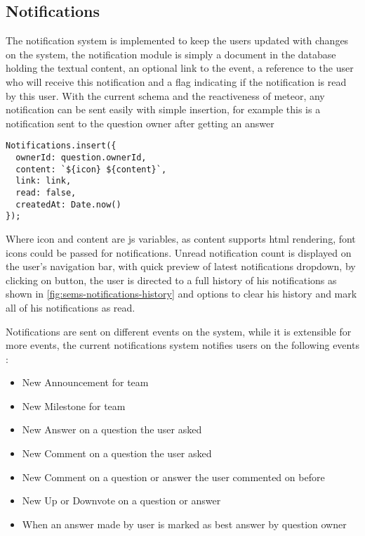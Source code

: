 \subsection{Notifications}
\label{sub:notifications}
The notification system is implemented to keep the users updated with changes on the system, the notification module is
simply a document in the database holding the textual content, an optional link to the event, a reference to the user who will receive this
notification and a flag indicating if the notification is read by this user. With the current schema and the reactiveness of meteor,
any notification can be sent easily with simple insertion, for example this is a notification sent to the question owner
after getting an answer
\vspace{15cm}
\begin{verbatim}
Notifications.insert({
  ownerId: question.ownerId,
  content: `${icon} ${content}`,
  link: link,
  read: false,
  createdAt: Date.now()
});
\end{verbatim}

\newParagraph
Where icon and content are \ac{js} variables, as content supports html rendering, font icons could be passed
for notifications. Unread notification count is displayed on the user's navigation bar, with quick preview of latest notifications dropdown,
by clicking on  button, the user is directed to a full history of his notifications as shown in \ref{fig:sems-notifications-history}
and options to clear his history and mark all of his notifications as read.

\newParagraph
Notifications are sent on different events on the system, while it is extensible for more events, the current notifications system notifies
users on the following events :
\begin{itemize}
  \item New Announcement for team
  \item New Milestone for team
  \item New Answer on a question the user asked
  \item New Comment on a question the user asked
  \item New Comment on a question or answer the user commented on before
  \item New Up or Downvote on a question or answer
  \item When an answer made by user is marked as best answer by question owner
\end{itemize}

